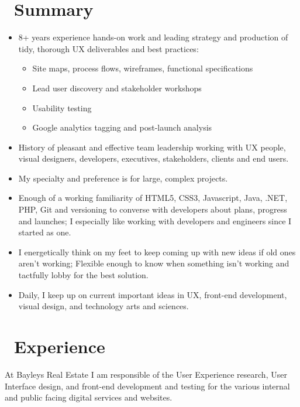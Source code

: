 \documentclass{resume}
\begin{document}



\section{\faUser\ Summary}
  \begin{itemize}
    \item 8+ years experience hands-on work and leading strategy and production of tidy, thorough UX deliverables and best practices:
    \begin{itemize}
      \item Site maps, process flows, wireframes, functional specifications
      \item Lead user discovery and stakeholder workshops
      \item Usability testing
      \item Google analytics tagging and post-launch analysis
    \end{itemize}
    \item History of pleasant and effective team leadership working with UX people, visual designers, developers, executives, stakeholders, clients and end users.
    \item My specialty and preference is for large, complex projects.
    \item Enough of a working familiarity of HTML5, CSS3, Javascript, Java, .NET, PHP, Git and versioning to converse with developers about plans, progress and launches; I especially like working with developers and engineers since I started as one.
    \item I energetically think on my feet to keep coming up with new ideas if old ones aren’t working; Flexible enough to know when something isn’t working and tactfully lobby for the best solution.
    \item Daily, I keep up on current important ideas in UX, front-end development, visual design, and technology arts and sciences.
  \end{itemize}

\section{\faUsers\ Experience}
  At Bayleys Real Estate I am responsible of the User Experience research, User Interface design, and front-end development and testing for the various internal and public facing digital services and websites.\par
\end{document}
